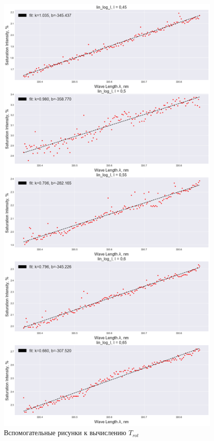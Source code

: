 \documentclass[a4paper,12pt]{article}
\begin{document}
\newpage
	\begin{figure}[H]
		\begin{center}
			\includegraphics[scale=0.4]{dependence_of_I}
			\caption{Вспомогательные рисунки к вычислению $T_{rot}$}
		\end{center}
	\end{figure}
	
\end{document}
